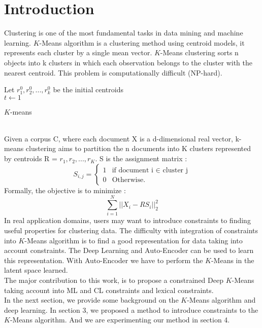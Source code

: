 \section{Introduction}\label{sec:intro}

Clustering is one of the most fundamental tasks in data mining and machine
learning. $K$-Means algorithm is a clustering method using centroid models,
it represents each cluster by a single mean vector. $K$-Means clustering sorts
n objects into k clusters in which each observation belongs to
the cluster with the nearest centroid. This problem is computationally
difficult (NP-hard).
\begin{algorithm}
  Let $r_1^{0}, r_2^{0} , ..., r_k^{0}$ be the initial centroids\\
  $t \gets 1$\\
  \caption{$K$-means}
\end{algorithm}
\\Given a corpus C, where each document X is a 
d-dimensional real vector, k-means clustering aims to partition the n 
documents into K clusters represented by centroids 
R = {$r_1, r_2, ..., r_K$}. S is the assignment matrix :
\begin{equation*}
  S_{i,j} = \left\{
\begin{array}{ll}
  1 & \mbox{if document i $\in$ cluster j}\\
  0 & \mbox{Otherwise.}
\end{array}
\right.
\end{equation*}
Formally, the objective is to minimize :
$$
\sum_{i =1 }^N ||X_i - RS_i ||_2^2
$$
In real application domains, users may want to introduce constraints to finding 
useful properties for clustering data. The difficulty with integration of 
constraints into $K$-Means algorithm is to find a good representation for data 
taking into account constraints. The Deep Learning and Auto-Encoder can be used 
to learn this representation. With Auto-Encoder we have to perform the $K$-Means 
in the latent space learned.
\\The major contribution to this work, is to propose a constrained Deep $K$-Means 
taking account into ML and CL constraints and lexical constraints.
\\In the next section, we provide some background on the $K$-Means algorithm and 
deep learning. In section 3, we proposed a method to introduce constraints to 
the $K$-Means algorithm. And we are experimenting our method in section 4.
